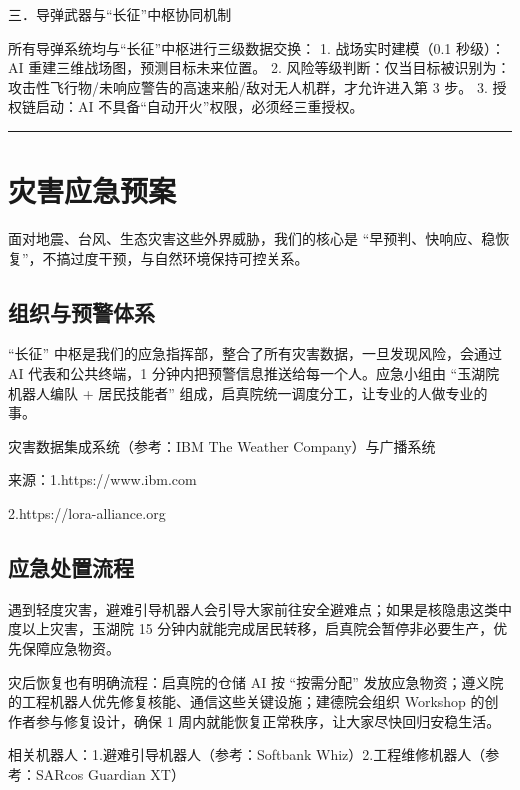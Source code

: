三．导弹武器与``长征''中枢协同机制

所有导弹系统均与``长征''中枢进行三级数据交换： 1. 战场实时建模（0.1 秒级）：AI 重建三维战场图，预测目标未来位置。 2. 风险等级判断：仅当目标被识别为：攻击性飞行物/未响应警告的高速来船/敌对无人机群，才允许进入第 3 步。 3. 授权链启动：AI 不具备``自动开火''权限，必须经三重授权。

\begin{center}\rule{0.5\linewidth}{0.5pt}\end{center}

\section{灾害应急预案}\label{ux707eux5bb3ux5e94ux6025ux9884ux6848}

面对地震、台风、生态灾害这些外界威胁，我们的核心是 ``早预判、快响应、稳恢复''，不搞过度干预，与自然环境保持可控关系。

\subsection{组织与预警体系}\label{ux7ec4ux7ec7ux4e0eux9884ux8b66ux4f53ux7cfb}

``长征'' 中枢是我们的应急指挥部，整合了所有灾害数据，一旦发现风险，会通过 AI 代表和公共终端，1 分钟内把预警信息推送给每一个人。应急小组由 ``玉湖院机器人编队 + 居民技能者'' 组成，启真院统一调度分工，让专业的人做专业的事。

灾害数据集成系统（参考：IBM The Weather Company）与广播系统

来源：1.https://www.ibm.com

2.https://lora-alliance.org

\subsection{应急处置流程}\label{ux5e94ux6025ux5904ux7f6eux6d41ux7a0b}

遇到轻度灾害，避难引导机器人会引导大家前往安全避难点；如果是核隐患这类中度以上灾害，玉湖院 15 分钟内就能完成居民转移，启真院会暂停非必要生产，优先保障应急物资。

灾后恢复也有明确流程：启真院的仓储 AI 按 ``按需分配'' 发放应急物资；遵义院的工程机器人优先修复核能、通信这些关键设施；建德院会组织 Workshop 的创作者参与修复设计，确保 1 周内就能恢复正常秩序，让大家尽快回归安稳生活。

相关机器人：1.避难引导机器人（参考：Softbank Whiz）2.工程维修机器人（参考：SARcos Guardian XT）

